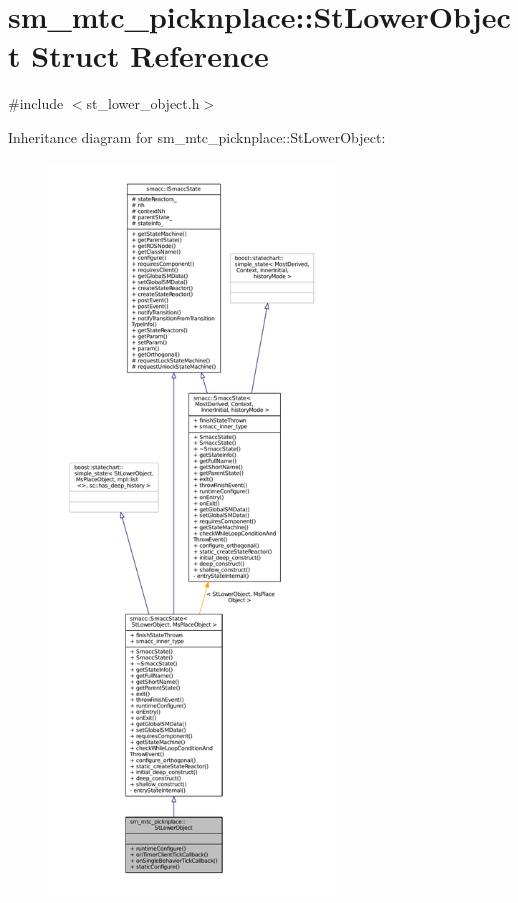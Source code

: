 \hypertarget{structsm__mtc__picknplace_1_1StLowerObject}{}\section{sm\+\_\+mtc\+\_\+picknplace\+:\+:St\+Lower\+Object Struct Reference}
\label{structsm__mtc__picknplace_1_1StLowerObject}


{\ttfamily \#include $<$st\+\_\+lower\+\_\+object.\+h$>$}



Inheritance diagram for sm\+\_\+mtc\+\_\+picknplace\+:\+:St\+Lower\+Object\+:
\nopagebreak
\begin{figure}[H]
\begin{center}
\leavevmode
\includegraphics[height=550pt]{structsm__mtc__picknplace_1_1StLowerObject__inherit__graph}
\end{center}
\end{figure}


